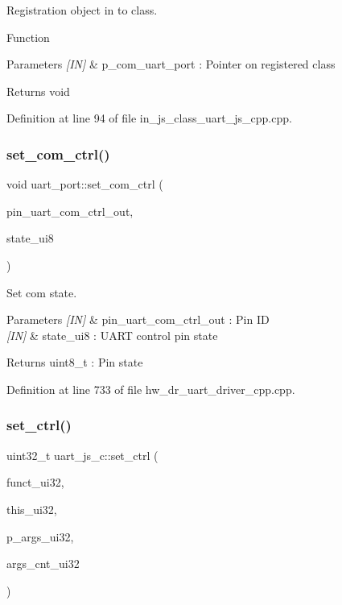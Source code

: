 Registration object in to class. 

Function
\begin{DoxyParams}{Parameters}
{\em \mbox{[}\+I\+N\mbox{]}} & p\+\_\+com\+\_\+uart\+\_\+port \+: Pointer on registered class \\
\hline
\end{DoxyParams}
\begin{DoxyReturn}{Returns}
void 
\end{DoxyReturn}


Definition at line 94 of file in\+\_\+js\+\_\+class\+\_\+uart\+\_\+js\+\_\+cpp.\+cpp.

\mbox{\label{group___u_a_r_t_gaa71949e90a185cad0572ab24167fdbe6}} 
\subsubsection{set\_com\_ctrl()}
{\footnotesize\ttfamily void uart\+\_\+port\+::set\+\_\+com\+\_\+ctrl (\begin{DoxyParamCaption}\item[{uart\+\_\+com\+\_\+ctrl\+\_\+out\+\_\+t}]{pin\+\_\+uart\+\_\+com\+\_\+ctrl\+\_\+out,  }\item[{uint8\+\_\+t}]{state\+\_\+ui8 }\end{DoxyParamCaption})}



Set com state. 


\begin{DoxyParams}{Parameters}
{\em \mbox{[}\+I\+N\mbox{]}} & pin\+\_\+uart\+\_\+com\+\_\+ctrl\+\_\+out \+: Pin ID \\
\hline
{\em \mbox{[}\+I\+N\mbox{]}} & state\+\_\+ui8 \+: U\+A\+RT control pin state \\
\hline
\end{DoxyParams}
\begin{DoxyReturn}{Returns}
uint8\+\_\+t \+: Pin state 
\end{DoxyReturn}


Definition at line 733 of file hw\+\_\+dr\+\_\+uart\+\_\+driver\+\_\+cpp.\+cpp.

\mbox{\label{group___u_a_r_t_gaf782349500b77ad99de17c0013a0a965}} 
\subsubsection{set\_ctrl()}
{\footnotesize\ttfamily uint32\+\_\+t uart\+\_\+js\+\_\+c\+::set\+\_\+ctrl (\begin{DoxyParamCaption}\item[{const uint32\+\_\+t}]{funct\+\_\+ui32,  }\item[{const uint32\+\_\+t}]{this\+\_\+ui32,  }\item[{const uint32\+\_\+t $\ast$}]{p\+\_\+args\+\_\+ui32,  }\item[{const uint32\+\_\+t}]{args\+\_\+cnt\+\_\+ui32 }\end{DoxyParamCaption})\hspace{0.3cm}{\ttfamily [static]}}



